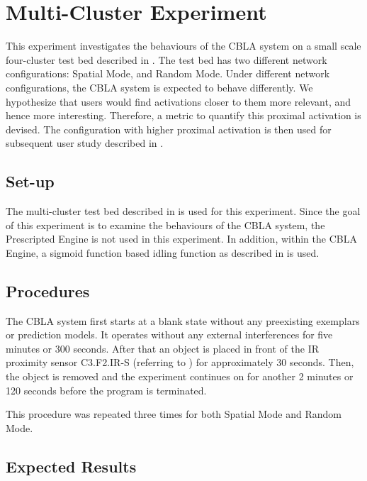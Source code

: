 \section{Multi-Cluster Experiment}\label{sec:multi-cluster-experiment}

This experiment investigates the behaviours of the CBLA system on a small scale four-cluster test bed described in . The test bed has two different network configurations: Spatial Mode, and Random Mode. Under different network configurations, the CBLA system is expected to behave differently. We hypothesize that users would find activations closer to them more relevant, and hence more interesting. Therefore, a metric to quantify this proximal activation is devised. The configuration with higher proximal activation is then used for subsequent user study described in .

\subsection{Set-up}\label{sec:multi-cluster-setup}

The multi-cluster test bed described in  is used for this experiment. Since the goal of this experiment is to examine the behaviours of the CBLA system, the Prescripted Engine is not used in this experiment. In addition, within the CBLA Engine, a sigmoid function based idling function as described in  is used.

\subsection{Procedures}

The CBLA system first starts at a blank state without any preexisting exemplars or prediction models. It operates without any external interferences for five minutes or 300 seconds. After that an object is placed in front of the IR proximity sensor C3.F2.IR-S (referring to ) for approximately 30 seconds. Then, the object is removed and the experiment continues on for another 2 minutes or 120 seconds before the program is terminated.

This procedure was repeated three times for both Spatial Mode and Random Mode.

\subsection{Expected Results}

